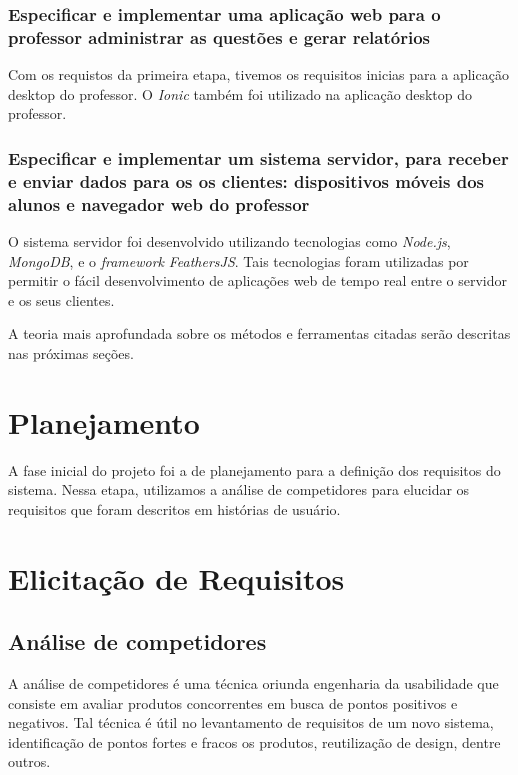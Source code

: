 \subsubsection{Especificar e implementar uma aplicação web para o professor administrar as questões e gerar relatórios}

Com os requistos da primeira etapa, tivemos os requisitos inicias para a aplicação desktop do professor.
O \textit{Ionic} também foi utilizado na aplicação desktop do professor.

\subsubsection{Especificar e implementar um sistema servidor, para receber e
    enviar dados para os os clientes: dispositivos móveis dos alunos e navegador
    web do professor}

O sistema servidor foi desenvolvido utilizando tecnologias como \textit{Node.js}, \textit{MongoDB}, e o \textit{framework} \textit{FeathersJS}.
Tais tecnologias foram utilizadas por permitir o fácil desenvolvimento de aplicações web de tempo real entre o servidor e os seus clientes.

A teoria mais aprofundada sobre os métodos e ferramentas citadas serão descritas nas próximas seções.

\section{Planejamento}

A fase inicial do projeto foi a de planejamento para a definição dos
requisitos do sistema. Nessa etapa, utilizamos a análise de competidores
para elucidar os requisitos que foram descritos em histórias de usuário.

\section{Elicitação de Requisitos}

\subsection{Análise de competidores}

A análise de competidores é uma técnica oriunda engenharia da usabilidade
que consiste em avaliar produtos concorrentes em busca de pontos positivos e
negativos. Tal técnica é útil no levantamento de requisitos de um novo sistema,
identificação de pontos fortes e fracos os produtos, reutilização de design, dentre outros.

